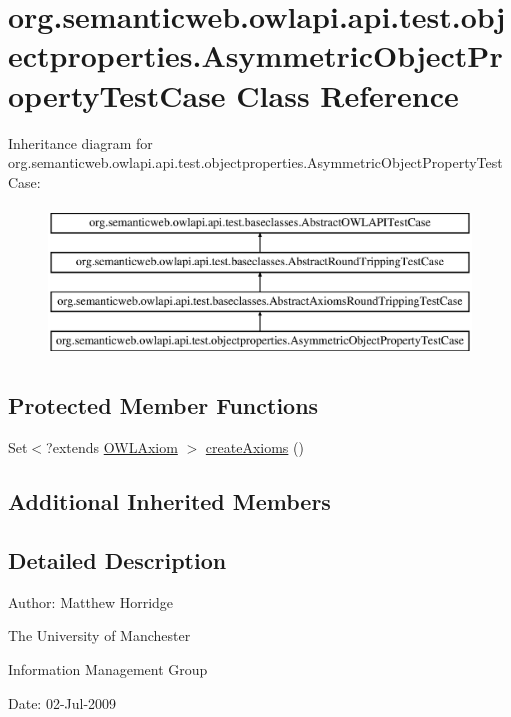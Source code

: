 \hypertarget{classorg_1_1semanticweb_1_1owlapi_1_1api_1_1test_1_1objectproperties_1_1_asymmetric_object_property_test_case}{\section{org.\-semanticweb.\-owlapi.\-api.\-test.\-objectproperties.\-Asymmetric\-Object\-Property\-Test\-Case Class Reference}
\label{classorg_1_1semanticweb_1_1owlapi_1_1api_1_1test_1_1objectproperties_1_1_asymmetric_object_property_test_case}
}
Inheritance diagram for org.\-semanticweb.\-owlapi.\-api.\-test.\-objectproperties.\-Asymmetric\-Object\-Property\-Test\-Case\-:\begin{figure}[H]
\begin{center}
\leavevmode
\includegraphics[height=4.000000cm]{classorg_1_1semanticweb_1_1owlapi_1_1api_1_1test_1_1objectproperties_1_1_asymmetric_object_property_test_case}
\end{center}
\end{figure}
\subsection*{Protected Member Functions}
\begin{DoxyCompactItemize}
\item 
Set$<$?extends \hyperlink{interfaceorg_1_1semanticweb_1_1owlapi_1_1model_1_1_o_w_l_axiom}{O\-W\-L\-Axiom} $>$ \hyperlink{classorg_1_1semanticweb_1_1owlapi_1_1api_1_1test_1_1objectproperties_1_1_asymmetric_object_property_test_case_aac42a98271bbdbc4999512ad2171e744}{create\-Axioms} ()
\end{DoxyCompactItemize}
\subsection*{Additional Inherited Members}


\subsection{Detailed Description}
Author\-: Matthew Horridge\par
 The University of Manchester\par
 Information Management Group\par
 Date\-: 02-\/\-Jul-\/2009 

